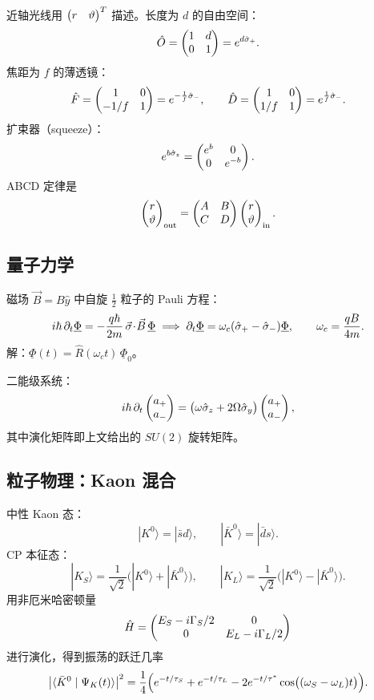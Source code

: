 近轴光线用 $\begin{pmatrix}r & \vartheta\end{pmatrix}^{T}$ 描述。长度为 $d$ 的自由空间：
\[
\hat{O} = \begin{pmatrix}1 & d \\ 0 & 1\end{pmatrix} = e^{d\hat{\sigma}_{+}}.
\]
焦距为 $f$ 的薄透镜：
\[
\hat{F} = \begin{pmatrix}1 & 0 \\ -1/f & 1\end{pmatrix} = e^{-\frac{1}{f}\hat{\sigma}_{-}},\qquad
\hat{D} = \begin{pmatrix}1 & 0 \\ 1/f & 1\end{pmatrix} = e^{\frac{1}{f}\hat{\sigma}_{-}}.
\]
扩束器（squeeze）：
\[
e^{b\hat{\sigma}_{z}} = \begin{pmatrix}e^{b} & 0 \\ 0 & e^{-b}\end{pmatrix}.
\]
ABCD 定律是
\[
\begin{pmatrix}r \\ \vartheta\end{pmatrix}_{\mathrm{out}}
= \begin{pmatrix}A & B \\ C & D\end{pmatrix}
  \begin{pmatrix}r \\ \vartheta\end{pmatrix}_{\mathrm{in}}.
\]

\subsection{量子力学}

磁场 $\vec{B}=B\hat{y}$ 中自旋 $\tfrac{1}{2}$ 粒子的 Pauli 方程：
\[
i\hbar\,\partial_{t}\underline{\Phi}
= -\frac{q\hbar}{2m}\,\vec{\sigma}\!\cdot\!\vec{B}\,\underline{\Phi}
\;\Longrightarrow\;
\partial_{t}\underline{\Phi}
= \omega_{c}(\hat{\sigma}_{+}-\hat{\sigma}_{-})\underline{\Phi},\qquad
\omega_{c} = \frac{qB}{4m}.
\]
解：$\underline{\Phi}(t) = \hat{R}(\omega_{c}t)\,\underline{\Phi}_{0}$。

二能级系统：
\[
i\hbar\,\partial_{t}\begin{pmatrix}a_{+} \\ a_{-}\end{pmatrix}
= \bigl(\omega\hat{\sigma}_{z} + 2\Omega\hat{\sigma}_{y}\bigr)\begin{pmatrix}a_{+} \\ a_{-}\end{pmatrix},
\]
其中演化矩阵即上文给出的 $SU(2)$ 旋转矩阵。

\subsection{粒子物理：Kaon 混合}

中性 Kaon 态：
\[
|K^{0}\rangle = |\bar{s}d\rangle,\qquad
|\bar{K}^{0}\rangle = |\bar{d}s\rangle.
\]
CP 本征态：
\[
|K_{S}\rangle = \frac{1}{\sqrt{2}}\bigl(|K^{0}\rangle + |\bar{K}^{0}\rangle\bigr),\qquad
|K_{L}\rangle = \frac{1}{\sqrt{2}}\bigl(|K^{0}\rangle - |\bar{K}^{0}\rangle\bigr).
\]
用非厄米哈密顿量
\[
\hat{H} = \begin{pmatrix}E_{S}-i\Gamma_{S}/2 & 0 \\ 0 & E_{L}-i\Gamma_{L}/2\end{pmatrix}
\]
进行演化，得到振荡的跃迁几率
\[
\bigl|\langle\bar{K}^{0}\mid\Psi_{K}(t)\rangle\bigr|^{2}
= \frac{1}{4}\Bigl(e^{-t/\tau_{S}} + e^{-t/\tau_{L}}
- 2e^{-t/\tau^{*}}\cos\bigl((\omega_{S}-\omega_{L})t\bigr)\Bigr).
\]

